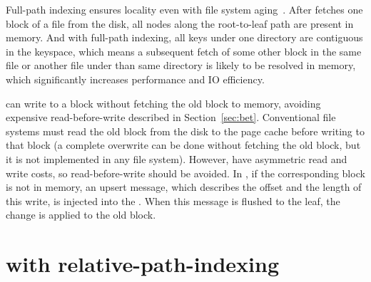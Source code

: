 Full-path indexing ensures locality even with file system aging~\citep{betrfs3}.
After \betrfs fetches one block of a file from the disk, all nodes along the
root-to-leaf path are present in memory.
And with full-path indexing, all keys under one directory are contiguous in the
keyspace, which means a subsequent fetch of some other block in the same file or
another file under than same directory is likely to be resolved in memory,
which significantly increases performance and IO efficiency.

\betrfs can write to a block without fetching the old block to memory, avoiding
expensive read-before-write described in Section~\ref{sec:bet}.
Conventional file systems must read the old block from the disk to the page
cache before writing to that block (a complete overwrite can be done without
fetching the old block, but it is not implemented in any file system).
However, \bets have asymmetric read and write costs, so read-before-write should
be avoided.
In \betrfs, if the corresponding block is not in memory, an upsert message,
which describes the offset and the length of this write, is injected into the
\bet.
When this message is flushed to the leaf, the change is applied to the old
block.

\section{\betrfs with relative-path-indexing}

